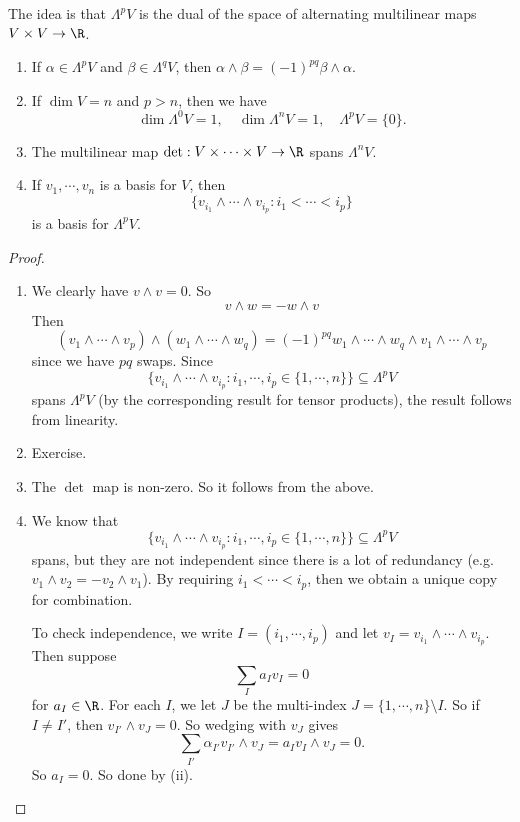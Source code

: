 \documentclass[a4paper]{article}
\begin{document}
The idea is that $\Lambda^p V$ is the dual of the space of alternating multilinear maps $V \times V\to \R$.

\begin{lemma}\leavevmode
  \begin{enumerate}
    \item If $\alpha \in \Lambda^p V$ and $\beta \in \Lambda^q V$, then $\alpha \wedge \beta = (-1)^{pq} \beta \wedge \alpha$.
    \item If $\dim V = n$ and $p > n$, then we have
      \[
        \dim \Lambda^0 V = 1,\quad \dim \Lambda^n V = 1,\quad \Lambda^p V = \{0\}.
      \]
    \item The multilinear map $\det: V \times \cdots \times V \to \R$ spans $\Lambda^n V$.
    \item If $v_1, \cdots, v_n$ is a basis for $V$, then
      \[
        \{v_{i_1} \wedge \cdots \wedge v_{i_p}: i_1 < \cdots < i_p\}
      \]
      is a basis for $\Lambda^p V$.
  \end{enumerate}
\end{lemma}

\begin{proof}\leavevmode
  \begin{enumerate}
    \item We clearly have $v \wedge v = 0$. So
      \[
        v \wedge w = - w \wedge v
      \]
      Then
      \[
        (v_1 \wedge \cdots \wedge v_p) \wedge (w_1 \wedge \cdots \wedge w_q) = (-1)^{pq} w_1 \wedge \cdots \wedge w_q \wedge v_1 \wedge \cdots \wedge v_p
      \]
      since we have $pq$ swaps. Since
      \[
        \{v_{i_1} \wedge \cdots \wedge v_{i_p}: i_1, \cdots, i_p \in \{1,\cdots, n\}\} \subseteq \Lambda^p V
      \]
      spans $\Lambda^p V$ (by the corresponding result for tensor products), the result follows from linearity.
    \item Exercise.
    \item The $\det$ map is non-zero. So it follows from the above.
    \item We know that
      \[
        \{v_{i_1} \wedge \cdots \wedge v_{i_p}: i_1, \cdots, i_p \in \{1,\cdots, n\}\} \subseteq \Lambda^p V
      \]
      spans, but they are not independent since there is a lot of redundancy (e.g.\ $v_1 \wedge v_2 = - v_2 \wedge v_1$). By requiring $i_1 < \cdots < i_p$, then we obtain a unique copy for combination.

      To check independence, we write $I = (i_1, \cdots, i_p)$ and let $v_I = v_{i_1} \wedge \cdots \wedge v_{i_p}$. Then suppose
      \[
        \sum_I a_I v_I = 0
      \]
      for $a_I \in \R$. For each $I$, we let $J$ be the multi-index $J = \{1, \cdots, n\} \setminus I$. So if $I \not= I'$, then $v_{I'} \wedge v_J = 0$. So wedging with $v_J$ gives
      \[
        \sum_{I'} \alpha_{I'} v_{I'} \wedge v_J = a_I v_I \wedge v_J = 0.
      \]
      So $a_I = 0$. So done by (ii). \qedhere
  \end{enumerate}
\end{proof}
\end{document}
